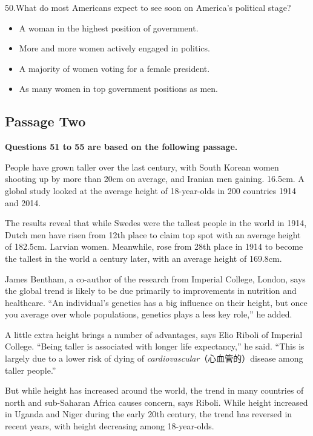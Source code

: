 \documentclass[UTF8,11pt]{ctexart}
\begin{document}
50.What do most Americans expect to see soon on America’s political stage?


\begin{itemize}[leftmargin=2em,itemsep=.2em,topsep=.4em]\item[A.] A woman in the highest position of government.
\item[B.] More and more women actively engaged in politics.
\item[C.] A majority of women voting for a female president.
\item[D.] As many women in top government positions as men.
\end{itemize}

\subsection*{\textbf{Passage Two}}


\textbf{Questions 51 to 55 are based on the following passage.}


People have grown taller over the last century, with South Korean women shooting up by more than 20cm on average, and Iranian men gaining. 16.5cm. A global study looked at the average height of 18-year-olds in 200 countries 1914 and 2014.


The results reveal that while Swedes were the tallest people in the world in 1914, Dutch men have risen from 12th place to claim top spot with an average height of 182.5cm. Larvian women. Meanwhile, rose from 28th place in 1914 to become the tallest in the world a century later, with an average height of 169.8cm.


James Bentham, a co-author of the research from Imperial College, London, says the global trend is likely to be due primarily to improvements in nutrition and healthcare. “An individual’s genetics has a big influence on their height, but once you average over whole populations, genetics plays a less key role,” he added.


A little extra height brings a number of advantages, says Elio Riboli of Imperial College. “Being taller is associated with longer life expectancy,” he said. “This is largely due to a lower risk of dying of\textit{ cardiovascular}（心血管的）disease among taller people.”


But while height has increased around the world, the trend in many countries of north and sub-Saharan Africa causes concern, says Riboli. While height increased in Uganda and Niger during the early 20th century, the trend has reversed in recent years, with height decreasing among 18-year-olds.
\end{document}
